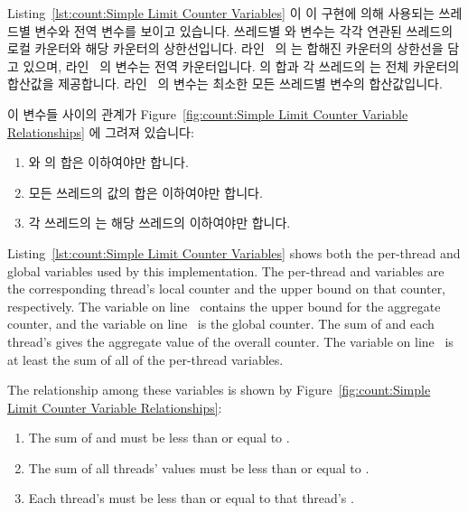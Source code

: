 \begin{fcvref}
Listing~\ref{lst:count:Simple Limit Counter Variables}
이 이 구현에 의해 사용되는 쓰레드별 변수와 전역 변수를 보이고 있습니다.
쓰레드별  와  변수는 각각 연관된 쓰레드의 로컬
카운터와 해당 카운터의 상한선입니다.
라인~ 의  는 합해진 카운터의 상한선을
담고 있으며, 라인~ 의  변수는 전역
카운터입니다.
 의 합과 각 쓰레드의  는 전체 카운터의 합산값을
제공합니다.
라인~ 의  변수는 최소한 모든 쓰레드별
 변수의 합산값입니다.
\end{fcvref}
이 변수들 사이의 관계가
Figure~\ref{fig:count:Simple Limit Counter Variable Relationships} 에 그려져
있습니다:
\begin{enumerate}
\item	{} 와  의 합은 
	이하여야만 합니다.
\item	모든 쓰레드의  값의 합은  이하여야만
	합니다.
\item	각 쓰레드의  는 해당 쓰레드의  이하여야만
	합니다.
\end{enumerate}

\iffalse

\begin{fcvref}
Listing~\ref{lst:count:Simple Limit Counter Variables}
shows both the per-thread and global variables used by this
implementation.
The per-thread  and  variables are the
corresponding thread's local counter and the upper bound on that
counter, respectively.
The  variable on
line~ contains the upper
bound for the aggregate counter, and the  variable
on line~ is the global counter.
The sum of  and each thread's  gives
the aggregate value of the overall counter.
The  variable on
line~ is at least the sum of all of the
per-thread  variables.
\end{fcvref}
The relationship among these variables is shown by
Figure~\ref{fig:count:Simple Limit Counter Variable Relationships}:
\begin{enumerate}
\item	The sum of  and  must
	be less than or equal to .
\item	The sum of all threads'  values must be
	less than or equal to .
\item	Each thread's  must be less than or equal to
	that thread's .
\end{enumerate}

